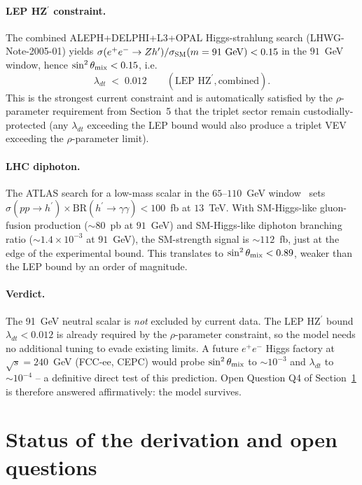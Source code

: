 \documentclass[11pt,a4paper]{article}
\begin{document}
\paragraph{LEP HZ$^\prime$ constraint.} The combined
ALEPH+DELPHI+L3+OPAL Higgs-strahlung search (LHWG-Note-2005-01) yields
$\sigma(e^+e^- \to Z h^\prime)/\sigma_{\rm SM}(m=91~{\rm GeV}) < 0.15$
in the $91$~GeV window, hence
$\sin^2\theta_{\rm mix} < 0.15$, i.e.\
\begin{equation}
  \lambda_{dt} \;<\; 0.012
  \qquad (\text{LEP HZ}^\prime, \text{combined}).
\end{equation}
This is the strongest current constraint and is automatically satisfied
by the $\rho$-parameter requirement from Section~5 that the triplet
sector remain custodially-protected (any $\lambda_{dt}$ exceeding the
LEP bound would also produce a triplet VEV exceeding the
$\rho$-parameter limit).

\paragraph{LHC diphoton.} The ATLAS search for a low-mass scalar in the
$65$--$110$~GeV window~\cite{Khan2018Triplet, Katayose2021TripletDM}
sets $\sigma(pp \to h^\prime) \times \mathrm{BR}(h^\prime \to
\gamma\gamma) < 100$~fb at $13$~TeV. With SM-Higgs-like gluon-fusion
production (${\sim}80$~pb at $91$~GeV) and SM-Higgs-like diphoton
branching ratio ($\sim 1.4\times 10^{-3}$ at $91$~GeV), the SM-strength
signal is $\sim 112$~fb, just at the edge of the experimental bound.
This translates to $\sin^2\theta_{\rm mix} < 0.89$, weaker than the LEP
bound by an order of magnitude.

\paragraph{Verdict.} The 91~GeV neutral scalar is \emph{not} excluded by
current data. The LEP HZ$^\prime$ bound $\lambda_{dt} < 0.012$ is
already required by the $\rho$-parameter constraint, so the model
needs no additional tuning to evade existing limits. A future $e^+e^-$
Higgs factory at $\sqrt s = 240$~GeV (FCC-ee, CEPC) would probe
$\sin^2\theta_{\rm mix}$ to $\sim 10^{-3}$ and $\lambda_{dt}$ to
$\sim 10^{-4}$ -- a definitive direct test of this prediction. Open
Question Q4 of Section~\ref{sec:status} is therefore answered
affirmatively: the model survives.

\section{Status of the derivation and open questions}
\label{sec:status}
\end{document}
